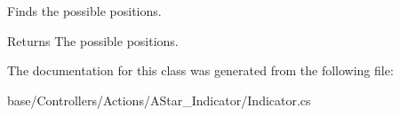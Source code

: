 Finds the possible positions. 

\begin{DoxyReturn}{Returns}
The possible positions.
\end{DoxyReturn}


The documentation for this class was generated from the following file\+:\begin{DoxyCompactItemize}
\item 
base/\+Controllers/\+Actions/\+A\+Star\+\_\+\+Indicator/Indicator.\+cs\end{DoxyCompactItemize}
